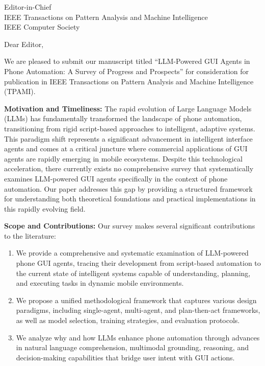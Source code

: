 \documentclass[11pt]{letter}
\begin{document}
\begin{letter}{Editor-in-Chief\\
IEEE Transactions on Pattern Analysis and Machine Intelligence\\
IEEE Computer Society}

\opening{Dear Editor,}

We are pleased to submit our manuscript titled ``LLM-Powered GUI Agents in Phone Automation: A Survey of Progress and Prospects'' for consideration for publication in IEEE Transactions on Pattern Analysis and Machine Intelligence (TPAMI).

\textbf{Motivation and Timeliness:} The rapid evolution of Large Language Models (LLMs) has fundamentally transformed the landscape of phone automation, transitioning from rigid script-based approaches to intelligent, adaptive systems. This paradigm shift represents a significant advancement in intelligent interface agents and comes at a critical juncture where commercial applications of GUI agents are rapidly emerging in mobile ecosystems. Despite this technological acceleration, there currently exists no comprehensive survey that systematically examines LLM-powered GUI agents specifically in the context of phone automation. Our paper addresses this gap by providing a structured framework for understanding both theoretical foundations and practical implementations in this rapidly evolving field.

\textbf{Scope and Contributions:} Our survey makes several significant contributions to the literature:

\begin{enumerate}
    \item We provide a comprehensive and systematic examination of LLM-powered phone GUI agents, tracing their development from script-based automation to the current state of intelligent systems capable of understanding, planning, and executing tasks in dynamic mobile environments.
    
    \item We propose a unified methodological framework that captures various design paradigms, including single-agent, multi-agent, and plan-then-act frameworks, as well as model selection, training strategies, and evaluation protocols.
    
    \item We analyze why and how LLMs enhance phone automation through advances in natural language comprehension, multimodal grounding, reasoning, and decision-making capabilities that bridge user intent with GUI actions.
    

\end{enumerate}
\end{letter}
\end{document}
